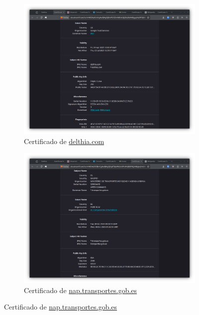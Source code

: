 \begin{figure}[H]
    \centering
    \begin{subfigure}{.5\textwidth}
        \centering
        \includegraphics[width=\textwidth]{cert-delthia.png}
        \caption{Certificado de \url{delthia.com}}
    \end{subfigure}%
    \begin{subfigure}{.5\textwidth}
        \centering
        \includegraphics[width=\textwidth]{cert-transportes.png}
        \caption{Certificado de \url{nap.transportes.gob.es}}
    \end{subfigure}
    

\end{figure}
